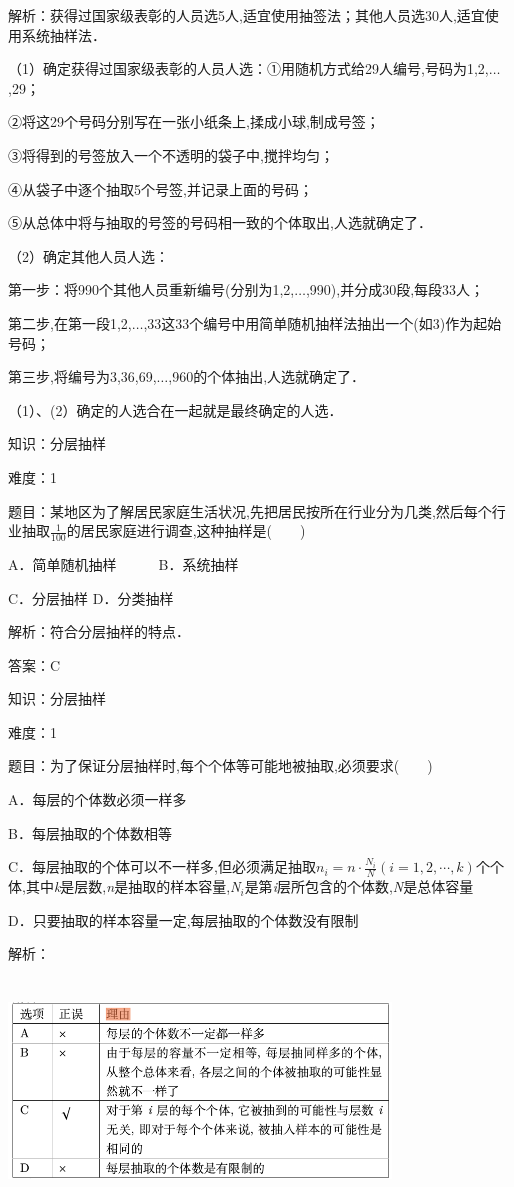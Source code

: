 \documentclass{article} %
\begin{document}
解析：获得过国家级表彰的人员选5人,适宜使用抽签法；其他人员选30人,适宜使用系统抽样法．

（1）确定获得过国家级表彰的人员人选：①用随机方式给29人编号,号码为1,2,$\dots$,29；

②将这29个号码分别写在一张小纸条上,揉成小球,制成号签；

③将得到的号签放入一个不透明的袋子中,搅拌均匀；

④从袋子中逐个抽取5个号签,并记录上面的号码；

⑤从总体中将与抽取的号签的号码相一致的个体取出,人选就确定了．

（2）确定其他人员人选：

第一步：将990个其他人员重新编号(分别为1,2,$\dots$,990),并分成30段,每段33人；

第二步,在第一段1,2,$\dots$,33这33个编号中用简单随机抽样法抽出一个(如3)作为起始号码；

第三步,将编号为3,36,69,$\dots$,960的个体抽出,人选就确定了．

（1）、(2）确定的人选合在一起就是最终确定的人选．


知识：分层抽样

难度：1

题目：某地区为了解居民家庭生活状况,先把居民按所在行业分为几类,然后每个行业抽取$\frac{1}{100}$的居民家庭进行调查,这种抽样是(　　)

A．简单随机抽样　　　B．系统抽样

C．分层抽样          D．分类抽样

解析：符合分层抽样的特点．

答案：C

知识：分层抽样

难度：1

题目：为了保证分层抽样时,每个个体等可能地被抽取,必须要求(　　)

A．每层的个体数必须一样多

B．每层抽取的个体数相等

C．每层抽取的个体可以不一样多,但必须满足抽取$n_i=n\cdot\frac{N_i}{N}(i=1,2,\cdots,k)$个个体,其中\textit{k}是层数,\textit{n}是抽取的样本容量,\textit{N${}_{i}$}是第\textit{i}层所包含的个体数,\textit{N}是总体容量

D．只要抽取的样本容量一定,每层抽取的个体数没有限制

解析：

\includegraphics*[width=4in, height=2.35in, keepaspectratio=false]{image115}
\end{document}
